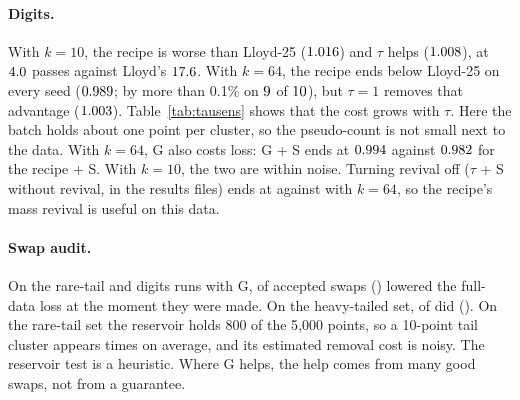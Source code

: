 \documentclass[11pt]{article}
\theoremstyle{remark}
\begin{document}
\paragraph{Digits.} With $k=10$, the recipe is worse than Lloyd-25 ($1.016$) and $\tau$
helps ($1.008$), at $4.0$ passes against Lloyd's $17.6$. With $k=64$,
the recipe ends below Lloyd-25 on every seed ($0.989$; by more than 0.1\% on
$9$ of $10$), but $\tau=1$ removes that advantage ($1.003$). Table~\ref{tab:tausens}
shows that the cost grows with $\tau$. Here the batch holds about one point per cluster, so the
pseudo-count is not small next to the data. With $k=64$, G also costs loss: G + S ends at
$0.994$ against $0.982$ for the recipe + S. With $k=10$, the
two are within noise. Turning revival off ($\tau$ + S without revival, in the results files)
ends at \ratioDSixtyFourNoRev{} against \ratioDSixtyFourPlusS{} with $k=64$, so the recipe's mass
revival is useful on this data.

\begin{table}[t]
\centering
\small
\caption{Change in final loss of the recipe + C on digits as $\tau$ varies, relative to
$\tau=10^{-10}$ (mean over the same 10 seeds). The check never fell back.}\label{tab:tausens}

\end{table}




\paragraph{Swap audit.} On the rare-tail and digits runs with G, \swapsSmallDown{} of
\swapsSmallTotal{} accepted swaps (\swapsSmallDownPct) lowered the full-data loss at the moment they
were made. On the heavy-tailed set, \swapsANNDown{} of \swapsANNTotal{} did (\swapsANNDownPct).
On the rare-tail set the reservoir holds 800 of the 5{,}000 points, so a 10-point tail cluster appears
\reservoirRT{} times on average, and its estimated removal cost is noisy. The reservoir test is a heuristic. Where G helps,
the help comes from many good swaps, not from a guarantee.
\end{document}
